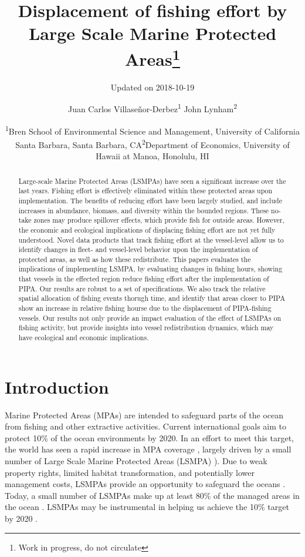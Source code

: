 \documentclass[11pt,]{article}
\title{Displacement of fishing effort by Large Scale Marine Protected
Areas\footnote{Work in progress, do not circulate}}
\subtitle{Updated on 2018-10-19}
\author{Juan Carlos Villaseñor-Derbez\textsuperscript{1} John
Lynham\textsuperscript{2}}
\date{\textsuperscript{1}Bren School of Environmental Science and Management,
University of California Santa Barbara, Santa Barbara,
CA\newline \textsuperscript{2}Department of Economics, University of
Hawaii at Manoa, Honolulu, HI}
\begin{document}
\maketitle
\begin{abstract}
Large-scale Marine Protected Areas (LSMPAs) have seen a significant
increase over the last years. Fishing effort is effectively eliminated
within these protected areas upon implementation. The benefits of
reducing effort have been largely studied, and include increases in
abundance, biomass, and diversity within the bounded regions. These
no-take zones may produce spillover effects, which provide fish for
outside areas. However, the economic and ecological implications of
displacing fishing effort are not yet fully understood. Novel data
products that track fishing effort at the vessel-level allow us to
identify changes in fleet- and vessel-level behavior upon the
implementation of protected areas, as well as how these redistribute.
This papers evaluates the implications of implementing LSMPA, by
evaluating changes in fishing hours, showing that vessels in the
effected region reduce fishing effort after the implementation of PIPA.
Our results are robust to a set of specifications. We also track the
relative spatial allocation of fishing events thorugh time, and identify
that areas closer to PIPA show an increase in relative fishing hourse
due to the displacement of PIPA-fishing vessels. Our results not only
provide an impact evaluation of the effect of LSMPAs on fishing
activity, but provide insights into vessel redistribution dynamics,
which may have ecological and economic implications.
\end{abstract}

\clearpage

\hypertarget{introduction}{%
\section{Introduction}\label{introduction}}

Marine Protected Areas (MPAs) are intended to safeguard parts of the
ocean from fishing and other extractive activities. Current
international goals aim to protect 10\% of the ocean environments by
2020. In an effort to meet this target, the world has seen a rapid
increase in MPA coverage \citep{wood_2008,sala_2018}, largely driven by
a small number of Large Scale Marine Protected Areas (LSMPA)
\citet{singleton_2014,boonzaier_2016,alger_2017}). Due to weak property
rights, limited habitat transformation, and potentially lower management
costs, LSMPAs provide an opportunity to safeguard the oceans
\citet{game_2009}. Today, a small number of LSMPAs make up at least 80\%
of the managed areas in the ocean \citet{toonen_2013}. LSMPAs may be
instrumental in helping us achieve the 10\% target by 2020
\citep{mccauley_2016}.
\end{document}
